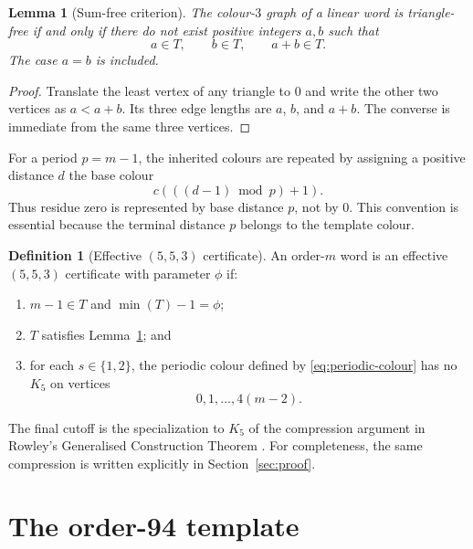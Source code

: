 \documentclass[11pt]{article}
\newtheorem{lemma}[theorem]{Lemma}
\theoremstyle{definition}
\newtheorem{definition}[theorem]{Definition}
\theoremstyle{remark}
\begin{document}
\begin{lemma}[Sum-free criterion]
\label{lem:sumfree}
The colour-$3$ graph of a linear word is triangle-free if and only if there
do not exist positive integers $a,b$ such that
\[
  a\in T,\qquad b\in T,\qquad a+b\in T.
\]
The case $a=b$ is included.
\end{lemma}

\begin{proof}
Translate the least vertex of any triangle to $0$ and write the other two
vertices as $a<a+b$.  Its three edge lengths are $a$, $b$, and $a+b$.
The converse is immediate from the same three vertices.
\end{proof}

For a period $p=m-1$, the inherited colours are repeated by assigning a
positive distance $d$ the base colour
\begin{equation}
  c\!\left(((d-1)\bmod p)+1\right).
  \label{eq:periodic-colour}
\end{equation}
Thus residue zero is represented by base distance $p$, not by $0$.  This
convention is essential because the terminal distance $p$ belongs to the
template colour.

\begin{definition}[Effective $(5,5,3)$ certificate]
\label{def:effective}
An order-$m$ word is an effective $(5,5,3)$ certificate with parameter
$\phi$ if:
\begin{enumerate}
  \item $m-1\in T$ and $\min(T)-1=\phi$;
  \item $T$ satisfies Lemma~\ref{lem:sumfree}; and
  \item for each $s\in\{1,2\}$, the periodic colour defined by
  \eqref{eq:periodic-colour} has no $K_5$ on vertices
  \[
    0,1,\ldots,4(m-2).
  \]
\end{enumerate}
\end{definition}

The final cutoff is the specialization to $K_5$ of the compression argument
in Rowley's Generalised Construction Theorem
\cite[Definition 3.1 and Theorem 3.2]{rowley-general}.  For completeness,
the same compression is written explicitly in
Section~\ref{sec:proof}.

\section{The order-94 template}
\label{sec:template}
\end{document}
